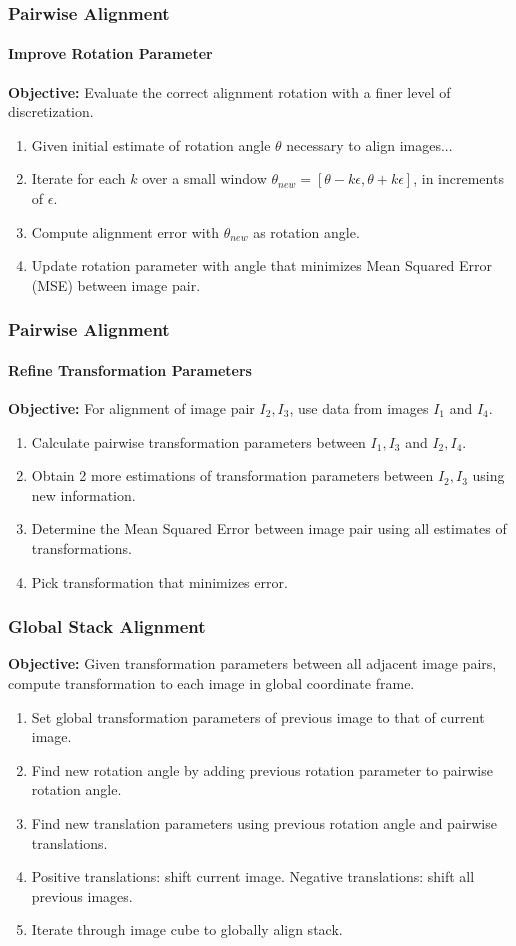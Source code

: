 \documentclass{beamer}
\begin{document}
\begin{frame}
\frametitle{Pairwise Alignment}
\framesubtitle{Improve Rotation Parameter} 
\textbf{Objective:} Evaluate the correct alignment rotation with a finer level of discretization. 
\begin{enumerate}
\item Given initial estimate of rotation angle $\theta$ necessary to align images...
\item Iterate for each $k$ over a small window $\theta_{new} = [\theta-k\epsilon, \theta+k\epsilon]$, in increments of $\epsilon$.
\item Compute alignment error with $\theta_{new}$ as rotation angle.
\item Update rotation parameter with angle that minimizes Mean Squared Error (MSE) between image pair.
\end{enumerate}
\end{frame}

\begin{frame}
\frametitle{Pairwise Alignment}
\framesubtitle{Refine Transformation Parameters}
\textbf{Objective:} For alignment of image pair $I_2, I_3$, use data from images $I_1$ and $I_4$. \\
\begin{enumerate}
\item Calculate pairwise transformation parameters between $I_1,I_3$ and $I_2,I_4$.
\item Obtain 2 more estimations of transformation parameters between $I_2,I_3$ using new information.
\item Determine the Mean Squared Error between image pair using all estimates of transformations.
\item Pick transformation that minimizes error.
\end{enumerate}
\end{frame}

\begin{frame}
\frametitle{Global Stack Alignment}
\textbf{Objective:} Given transformation parameters between all adjacent image pairs, compute transformation to each image in global coordinate frame.
\begin{enumerate}
\item Set global transformation parameters of previous image to that of current image. 
\item Find new rotation angle by adding previous rotation parameter to pairwise rotation angle. 
\item Find new translation parameters using previous rotation angle and pairwise translations.
\item Positive translations: shift current image. Negative translations: shift all previous images.
\item Iterate through image cube to globally align stack. 
\end{enumerate}
\end{frame}
\end{document}
